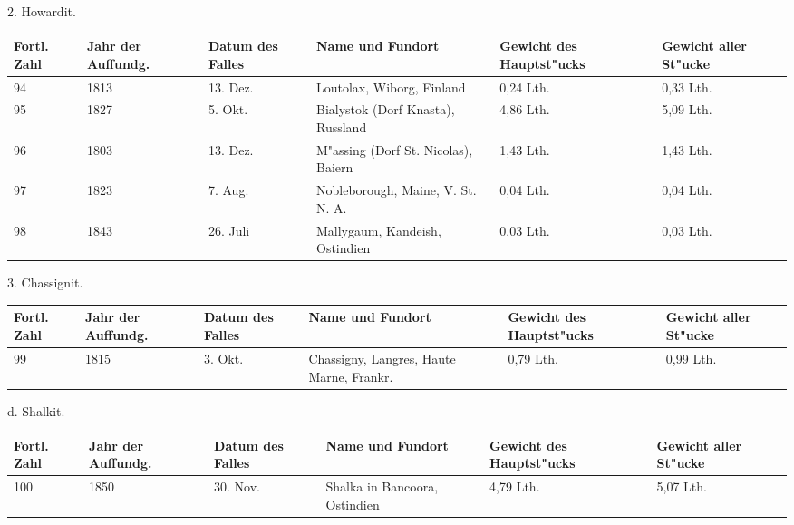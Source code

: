 \documentclass[a4paper, 11pt, oneside, german]{article}
\begin{document}
\clearpage
\begin{center}
2. Howardit.
\end{center}
\begin{center}
\begin{footnotesize}
\begin{tabular}{ |p{7mm}|p{7mm}|p{13mm}|p{48mm}|p{22mm}|p{22mm}| }
    \hline
    Fortl. Zahl & Jahr der Auffundg. & Datum des Falles & Name und Fundort & Gewicht des Hauptst"ucks & Gewicht aller St"ucke\\
    \hline\hline
    94 & 1813 & 13. Dez. & Loutolax, Wiborg, Finland & 0,24 Lth. & 0,33 Lth.\\\hline
    95 & 1827 & 5. Okt. & Bialystok (Dorf Knasta), Russland & 4,86 Lth. & 5,09 Lth.\\\hline
    96 & 1803 & 13. Dez. & M"assing (Dorf St. Nicolas), Baiern & 1,43 Lth. & 1,43 Lth.\\\hline
    97 & 1823 & 7. Aug. & Nobleborough, Maine, V. St. N. A. & 0,04 Lth. & 0,04 Lth.\\\hline
    98 & 1843 & 26. Juli & Mallygaum, Kandeish, Ostindien & 0,03 Lth. & 0,03 Lth.\\
    \hline
\end{tabular}
\end{footnotesize}
\end{center}
\begin{center}
3. Chassignit.
\end{center}
\begin{center}
\begin{footnotesize}
\begin{tabular}{ |p{7mm}|p{7mm}|p{13mm}|p{48mm}|p{22mm}|p{22mm}| }
    \hline
    Fortl. Zahl & Jahr der Auffundg. & Datum des Falles & Name und Fundort & Gewicht des Hauptst"ucks & Gewicht aller St"ucke\\
    \hline\hline
    99 & 1815 & 3. Okt. & Chassigny, Langres, Haute Marne, Frankr. & 0,79 Lth. & 0,99 Lth.\\
    \hline
\end{tabular}
\end{footnotesize}
\end{center}
\begin{center}
d. Shalkit.
\end{center}
\begin{center}
\begin{footnotesize}
\begin{tabular}{ |p{7mm}|p{7mm}|p{13mm}|p{48mm}|p{22mm}|p{22mm}| }
    \hline
    Fortl. Zahl & Jahr der Auffundg. & Datum des Falles & Name und Fundort & Gewicht des Hauptst"ucks & Gewicht aller St"ucke\\
    \hline\hline
    100 & 1850 & 30. Nov. & Shalka in Bancoora, Ostindien & 4,79 Lth. & 5,07 Lth.\\
    \hline
\end{tabular}
\end{footnotesize}
\end{center}
\end{document}
